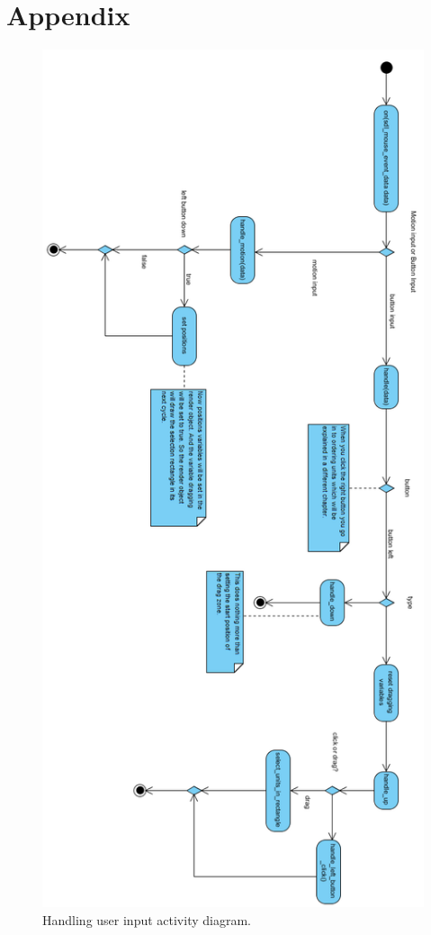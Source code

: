 \section{Appendix}


\begin{figure}[!htb]
    \centering
    \includegraphics[scale=0.8]{images/ActivityDiagramMouseHandler180.PNG}
    \caption{Handling user input activity diagram.}\label{fig:fuzzy-distance}
\end{figure}